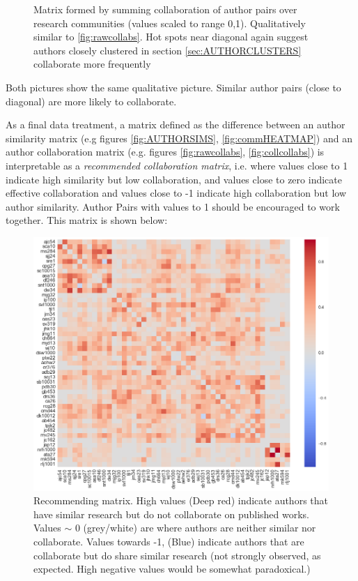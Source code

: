 \begin{figure}[H]
\begin{minipage}[b]{0.49\textwidth}
    \caption{Matrix formed by summing collaboration of author pairs over research communities (values scaled to range 0,1). Qualitatively similar to \ref{fig:rawcollabs}. Hot spots near diagonal again suggest authors closely clustered in section \ref{sec:AUTHORCLUSTERS} collaborate more frequently }
  \end{minipage}
\end{figure}

Both pictures show the same qualitative picture. Similar author pairs (close to diagonal) are more likely to collaborate. 

As a final data treatment, a matrix defined as the difference between an author similarity matrix (e.g figures \ref{fig:AUTHORSIMS}, \ref{fig:commHEATMAP}) and an author collaboration matrix (e.g. figures \ref{fig:rawcollabs}, \ref{fig:collcollabs}) is interpretable as a \emph{recommended collaboration matrix}, i.e. where values close to 1 indicate high similarity but low collaboration, and values close to zero indicate effective collaboration and values close to -1 indicate high collaboration but low author similarity. Author Pairs with values to 1 should be encouraged to work together. This matrix is shown below:
\begin{center}
\begin{figure}[H]
\label{fig:RECOMM_MAT}
  \centering
    \includegraphics[scale=0.8]{Analysis/Recommending_Mat.png}
    \caption{Recommending matrix. High values (Deep red) indicate authors that have similar research but do not collaborate on published works. Values $\sim$ 0 (grey/white) are where authors are neither similar nor collaborate. Values towards -1, (Blue) indicate authors that are collaborate but do share similar research (not strongly observed, as expected. High negative values would be somewhat paradoxical.) }
\end{figure} 
\end{center}
